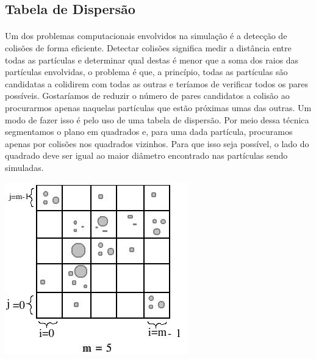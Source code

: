 \documentclass[a0,portrait]{a0poster}
\begin{document}
\begin{multicols}{2}
\begin{minipage}{0.25\textwidth}
\begin{center}
\begin{picture}
          \end{picture}
	\label{fig:MD}
\end{center}\vspace{1cm}

\end{minipage}

\subsection*{Tabela de Dispersão}
\vspace{-2cm}
\begin{minipage}{0.25\textwidth}
\paragraph{}Um dos problemas computacionais envolvidos na simulação é a
detecção de colisões de forma eficiente. Detectar colisões significa medir a
distância entre todas as partículas e determinar qual destas é menor que a soma
dos raios das partículas envolvidas, o problema é que, a princípio, todas as
partículas são candidatas a colidirem com todas as outras e teríamos de
verificar todos os pares possíveis. Gostaríamos de reduzir o número de pares
candidatos a colisão ao procurarmos apenas naquelas partículas que estão
próximas umas das outras. Um modo de fazer isso é pelo uso de uma tabela de
dispersão. Por meio dessa técnica segmentamos o plano em quadrados e, para
uma dada partícula, procuramos apenas por colisões nos quadrados vizinhos. 
Para que isso seja possível, o lado do quadrado deve ser igual ao maior
diâmetro encontrado nas partículas sendo simuladas.
\end{minipage}
\begin{minipage}{0.25\textwidth}
\begin{center}\vspace{3cm}
\includegraphics[width=0.8\linewidth]{../images/hash.jpeg}
\end{center}\vspace{1cm}
\end{minipage}


\end{multicols}
\end{document}

